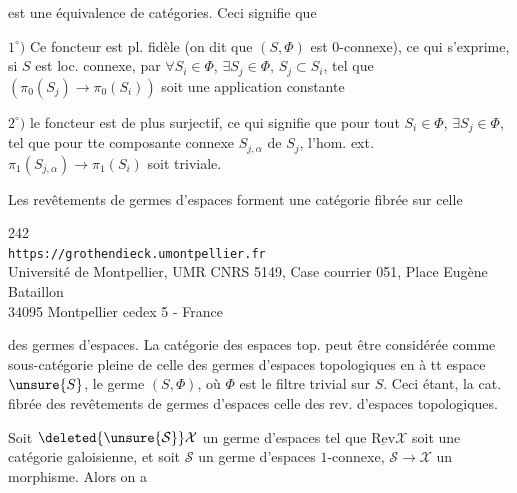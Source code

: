 est une équivalence de catégories. Ceci signifie que

$1^\circ)$ Ce foncteur est pl. fidèle (on dit que $(S,\Phi)$ est $0$-connexe), ce qui s'exprime, si $S$ est loc. connexe, par $\forall S_i\in\Phi$, $\exists S_j\in\Phi$, $S_j\subset S_i$, tel que  $(\pi_0(S_j)\longrightarrow\pi_0(S_i))$ soit une application constante


$2^\circ)$ le foncteur est de plus  surjectif, ce qui signifie que pour tout $S_i\in\Phi$, $\exists S_j\in\Phi$,  tel que pour tte composante connexe $S_{j,\alpha}$ de $S_j$, l'hom. ext. $\pi_1(S_{j,\alpha})\longrightarrow\pi_1(S_i)$ soit triviale.

Les revêtements de germes d'espaces forment une catégorie fibrée sur celle


\begin{center}
242\\
\texttt{https://grothendieck.umontpellier.fr}\\
Université de Montpellier, UMR CNRS 5149, Case courrier 051, Place Eugène Bataillon\\
34095 Montpellier cedex 5 - France
\end{center}

des germes d'espaces. La catégorie des espaces top.  peut être considérée comme sous-catégorie pleine de celle des germes d'espaces topologiques en  à tt espace $\unsure{S}$, le germe $(S,\Phi)$, où $\Phi$ est le filtre trivial sur $S$. Ceci étant, la cat. fibrée des revêtements de germes d'espaces  celle des rev. d'espaces topologiques.

Soit $\deleted{\unsure{\mathcal S}}\mathcal X$ un germe d'espaces tel que $\underline{\mathrm{Rev}}\mathcal X$ soit une catégorie galoisienne,  et soit $\mathcal S$ un germe d'espaces $1$-connexe, $\mathcal S\longrightarrow\mathcal X$ un morphisme. Alors on a


